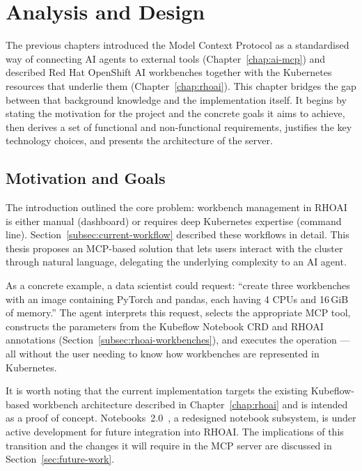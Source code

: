 \documentclass[
  digital,     %
  oneside,     %
  nosansbold,  %
  nocolorbold, %
  lof,         %
  lot,         %
]{fithesis4}
\begin{document}
\chapter{Analysis and Design}
\label{chap:analysis}

The previous chapters introduced the Model Context Protocol as a standardised
way of connecting AI agents to external tools
(Chapter~\ref{chap:ai-mcp}) and described Red Hat OpenShift AI workbenches
together with the Kubernetes resources that underlie them
(Chapter~\ref{chap:rhoai}). This chapter bridges the gap between that
background knowledge and the implementation itself. It begins by stating the
motivation for the project and the concrete goals it aims to achieve, then
derives a set of functional and non-functional requirements, justifies the
key technology choices, and presents the architecture of the server.

\section{Motivation and Goals}
\label{sec:motivation}

The introduction outlined the core problem: workbench management in RHOAI
is either manual (dashboard) or requires deep Kubernetes expertise
(command line). Section~\ref{subsec:current-workflow} described these
workflows in detail. This thesis proposes an MCP-based solution that lets
users interact with the cluster through natural language, delegating the
underlying complexity to an AI agent.

As a concrete example, a data scientist could request: \enquote{create three
workbenches with an image containing PyTorch and pandas, each having 4 CPUs
and 16\,GiB of memory.} The agent interprets this request, selects the
appropriate MCP tool, constructs the parameters from the Kubeflow Notebook
CRD and RHOAI annotations (Section~\ref{subsec:rhoai-workbenches}), and
executes the operation --- all without the user needing to know how
workbenches are represented in Kubernetes.

It is worth noting that the current implementation targets the existing
Kubeflow-based workbench architecture described in
Chapter~\ref{chap:rhoai} and is intended as a proof of concept.
Notebooks~2.0~\parencite{notebooks-v2}, a redesigned notebook subsystem, is
under active development for future integration into RHOAI. The
implications of this transition and the changes it will require in the MCP
server are discussed in Section~\ref{sec:future-work}.
\end{document}
